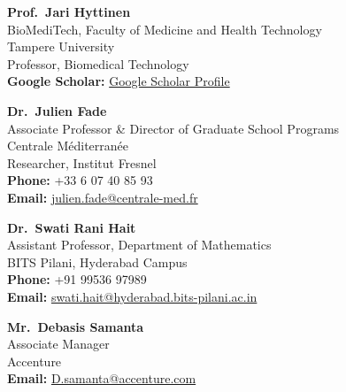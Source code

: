 \documentclass[10pt,a4paper]{moderncv}
\begin{document}
\noindent
\begin{minipage}[t]{0.48\textwidth}
  \textbf{Prof.~Jari Hyttinen} \\
  BioMediTech, Faculty of Medicine and Health Technology \\
  Tampere University \\
  Professor, Biomedical Technology \\
  \textbf{Google Scholar:} \href{https://scholar.google.com/citations?user=YKuQ-YsAAAAJ\&hl=en}{Google Scholar Profile}
\end{minipage}
\hfill
\begin{minipage}[t]{0.48\textwidth}
  \textbf{Dr.~Julien Fade} \\
  Associate Professor \& Director of Graduate School Programs \\
  Centrale Méditerranée \\
  Researcher, Institut Fresnel \\
  \textbf{Phone:} +33 6 07 40 85 93 \\
  \textbf{Email:} \href{mailto:julien.fade@centrale-med.fr}{julien.fade@centrale-med.fr}
\end{minipage}

\vspace{0.5cm}

\noindent
\begin{minipage}[t]{0.48\textwidth}
  \textbf{Dr.~Swati Rani Hait} \\
  Assistant Professor, Department of Mathematics \\
  BITS Pilani, Hyderabad Campus \\
  \textbf{Phone:} +91 99536 97989 \\
  \textbf{Email:} \href{mailto:swati.hait@hyderabad.bits-pilani.ac.in}{swati.hait@hyderabad.bits-pilani.ac.in}
\end{minipage}
\hfill
\begin{minipage}[t]{0.48\textwidth}
  \textbf{Mr.~Debasis Samanta} \\
  Associate Manager \\
  Accenture \\
  \textbf{Email:} \href{mailto:D.samanta@accenture.com}{D.samanta@accenture.com}
\end{minipage}
\end{document}
